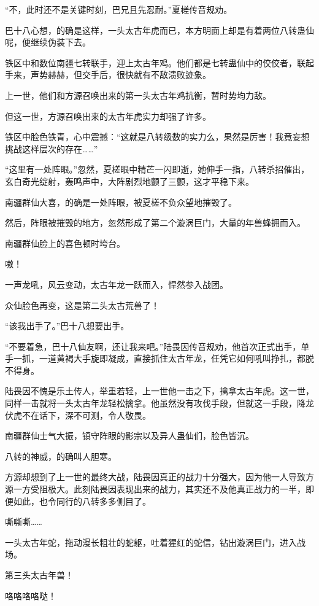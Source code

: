 \begin{this_body}
“不，此时还不是关键时刻，巴兄且先忍耐。”夏槎传音规劝。

巴十八心想，的确是这样，一头太古年虎而已，本方明面上却是有着两位八转蛊仙呢，便继续伪装下去。

铁区中和数位南疆七转联手，迎上太古年鸡。他们都是七转蛊仙中的佼佼者，联起手来，声势赫赫，但交手后，很快就有不敌溃败迹象。

上一世，他们和方源召唤出来的第一头太古年鸡抗衡，暂时势均力敌。

但这一世，方源召唤出来的太古年虎实力却强了许多。

铁区中脸色铁青，心中震撼：“这就是八转级数的实力么，果然是厉害！我竟妄想挑战这样层次的存在……”

“这里有一处阵眼。”忽然，夏槎眼中精芒一闪即逝，她伸手一指，八转杀招催出，玄白奇光绽射，轰鸣声中，大阵剧烈地颤了三颤，这才平稳下来。

南疆群仙大喜，的确是一处阵眼，被夏槎不负众望地摧毁了。

然后，阵眼被摧毁的地方，忽然形成了第二个漩涡巨门，大量的年兽蜂拥而入。

南疆群仙脸上的喜色顿时垮台。

嗷！

一声龙吼，风云变动，太古年龙一跃而入，悍然参入战团。

众仙脸色再变，这是第二头太古荒兽了！

“该我出手了。”巴十八想要出手。

“不要着急，巴十八仙友啊，还让我来吧。”陆畏因传音规劝，他首次正式出手，单手一抓，一道黄褐大手旋即凝成，直接抓住太古年龙，任凭它如何吼叫挣扎，都脱不得身。

陆畏因不愧是乐土传人，举重若轻，上一世他一击之下，擒拿太古年虎。这一世，同样一击就将一头太古年龙轻松擒拿。他虽然没有攻伐手段，但就这一手段，降龙伏虎不在话下，深不可测，令人敬畏。

南疆群仙士气大振，镇守阵眼的影宗以及异人蛊仙们，脸色皆沉。

八转的神威，的确叫人胆寒。

方源却想到了上一世的最终大战，陆畏因真正的战力十分强大，因为他一人导致方源一方受阻极大。此刻陆畏因表现出来的战力，其实还不及他真正战力的一半，即便如此，也令同行的八转多多侧目了。

嘶嘶嘶……

一头太古年蛇，拖动漫长粗壮的蛇躯，吐着猩红的蛇信，钻出漩涡巨门，进入战场。

第三头太古年兽！

咯咯咯咯哒！


\end{this_body}
